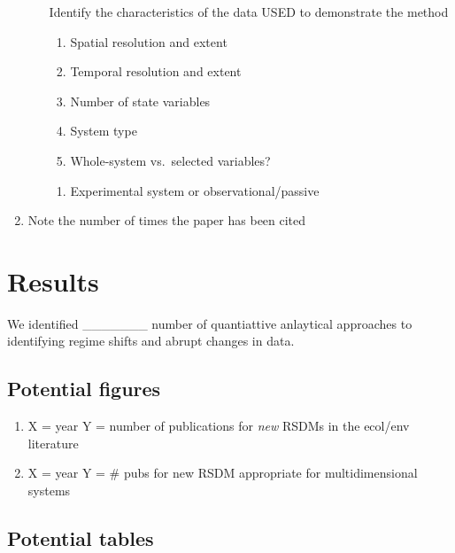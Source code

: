 \documentclass[12pt,twoside]{reedthesis}
\providecommand{\tightlist}{%
  \setlength{\itemsep}{0pt}\setlength{\parskip}{0pt}}
\def\labelenumi{\arabic{enumi}.}
\def\labelenumi{\arabic{enumi}.}
\begin{document}
\begin{enumerate}
\begin{enumerate}
    Identify the characteristics of the data USED to demonstrate the method
    \begin{enumerate}
    \def\labelenumiii{\alph{enumiii}.}
    \tightlist
    \item
      Spatial resolution and extent
    \item
      Temporal resolution and extent
    \item
      Number of state variables
    \item
      System type
    \item
      Whole-system vs.~selected variables?
    \end{enumerate}
    \begin{enumerate}
    \def\labelenumiii{\roman{enumiii}.}
    \setcounter{enumiii}{1}
    \tightlist
    \item
      Experimental system or observational/passive
    \end{enumerate}
  \end{enumerate}
\item
  Note the number of times the paper has been cited
\end{enumerate}
\hypertarget{results}{%
\section{Results}\label{results}}

We identified \_\_\_\_\_\_\_ number of quantiattive anlaytical approaches to identifying regime shifts and abrupt changes in data.

\hypertarget{potential-figures}{%
\subsection{Potential figures}\label{potential-figures}}
\begin{enumerate}
\def\labelenumi{\arabic{enumi}.}
\tightlist
\item
  X = year Y = number of publications for \emph{new} RSDMs in the ecol/env literature
\item
  X = year Y = \# pubs for new RSDM appropriate for multidimensional systems
\end{enumerate}
\hypertarget{potential-tables}{%
\subsection{Potential tables}\label{potential-tables}}
\end{document}
